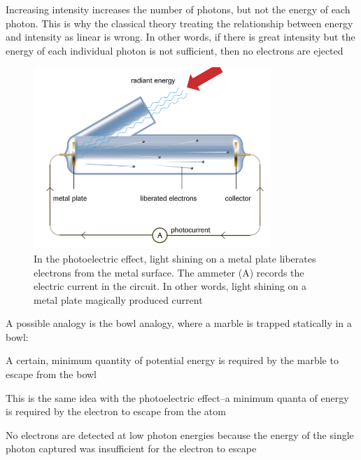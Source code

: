 \begin{important}
    Increasing intensity increases the number of photons, but not the energy of each photon. 
    This is why the classical theory treating the relationship between energy and intensity as
    linear is wrong. In other words, if there is great intensity but the energy of each individual 
    photon is not sufficient, then no electrons are ejected
\end{important}

\begin{figure}[ht!]
    \centering
    \includegraphics[width=0.8\textwidth]{../figures/photoelectric-effect.png}
    \caption{In the photoelectric effect, light shining on a metal plate liberates electrons from
        the metal surface. The ammeter (A) records the electric current in the circuit. In other
        words, light shining on a metal plate magically produced current}
    \label{fig:photoelectric-effect}
\end{figure}

A possible analogy is the bowl analogy, where a marble is trapped statically in a bowl:
\begin{bulleted-list}
    \item A certain, minimum quantity of potential energy is required by the marble to escape
        from the bowl
    \item This is the same idea with the photoelectric effect--a minimum quanta of energy is
        required by the electron to escape from the atom
    \item No electrons are detected at low photon energies because the energy of the single photon
        captured was insufficient for the electron to escape
\end{bulleted-list}


